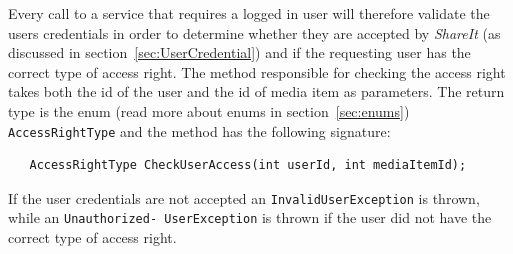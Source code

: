 \documentclass[../report.tex]{subfiles}
\begin{document}
Every call to a service that requires a logged in user will therefore validate the users credentials in order to determine whether they are accepted by \textit{ShareIt} (as discussed in section~\ref{sec:UserCredential}) and if the requesting user has the correct type of access right. The method responsible for checking the access right takes both the id of the user and the id of media item as parameters. The return type is the enum (read more about enums in section~\ref{sec:enums}) \texttt{AccessRightType} and the method has the following signature:

\begin{lstlisting}
   AccessRightType CheckUserAccess(int userId, int mediaItemId);
\end{lstlisting}


If the user credentials are not accepted an \texttt{InvalidUserException} is thrown, while an \texttt{Unauthorized- UserException} is thrown if the user did not have the correct type of access right. 
\end{document}
